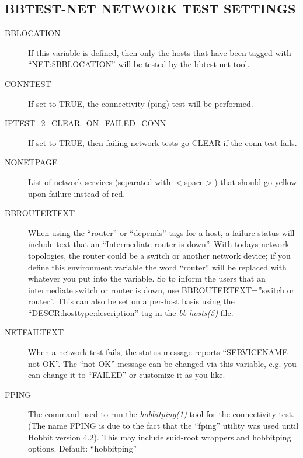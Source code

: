 \subsection{BBTEST-NET NETWORK TEST SETTINGS}


 \begin{description}
\item[BBLOCATION] If this variable is defined, then only the hosts that have been tagged with ``NET:\$BBLOCATION'' will be tested by the bbtest-net tool. 

 

\item[CONNTEST] If set to TRUE, the connectivity (ping) test will be performed. 

 

\item[IPTEST\_2\_CLEAR\_ON\_FAILED\_CONN] If set to TRUE, then failing network tests go CLEAR if the conn-test fails. 

 

\item[NONETPAGE] List of network services (separated with $<$space$>$) that should go yellow upon failure instead of red. 

 

\item[BBROUTERTEXT] When using the ``router'' or ``depends'' tags for a host, a failure status will include text that an ``Intermediate router is down''. With todays network topologies, the router could be a switch or another network device; if you define this environment variable the word ``router'' will be replaced with whatever you put into the variable. So to inform the users that an intermediate switch or router is down, use BBROUTERTEXT=''switch or router''. This can also be set on a per-host basis using the ``DESCR:hosttype:description'' tag in the \emph{bb-hosts(5)}
 file. 

 

\item[NETFAILTEXT] When a network test fails, the status message reports ``SERVICENAME not OK''. The ``not OK'' message can be changed via this variable, e.g. you can change it to ``FAILED'' or customize it as you like. 

 

\item[FPING] The command used to run the \emph{hobbitping(1)}
 tool for the connectivity test. (The name FPING is due to the fact that the ``fping'' utility was used until Hobbit version 4.2). This may include suid-root wrappers and hobbitping options. Default: ``hobbitping'' 


\end{description}
